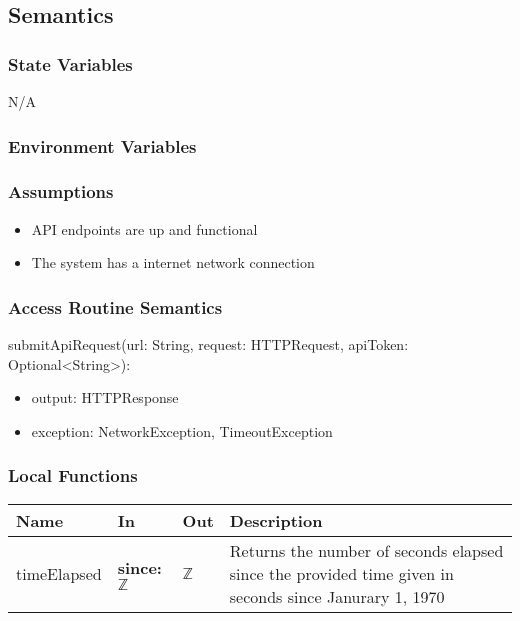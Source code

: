 \documentclass[12pt, titlepage]{article}
\begin{document}
{  \subsection{Semantics}

  \subsubsection{State Variables}
  N/A

  \subsubsection{Environment Variables}

  \subsubsection{Assumptions}
  \begin{itemize}
    \item API endpoints are up and functional
    \item The system has a internet network connection
  \end{itemize}
  \subsubsection{Access Routine Semantics}

  \noindent submitApiRequest(url: String, request: HTTPRequest, apiToken:
  Optional\textless String\textgreater):
  \begin{itemize}
    \item output: HTTPResponse
    \item exception: NetworkException, TimeoutException
  \end{itemize}

  \subsubsection{Local Functions}

  \begin{center}
    \begin{tabular}{>{\raggedright}p{3cm} >{\raggedright}p{5cm}
      >{\raggedright}p{4cm} p{4cm}}
      \hline
      \textbf{Name} & \textbf{In} & \textbf{Out} & \textbf{Description} \\
      \hline
      timeElapsed & \textbf{since:} $\mathbb{Z}$ & $\mathbb{Z}$ & Returns the
      number of seconds elapsed since the provided time given in seconds since
      Janurary 1, 1970 \\
      \hline
    \end{tabular}
  \end{center}

}
\end{document}
